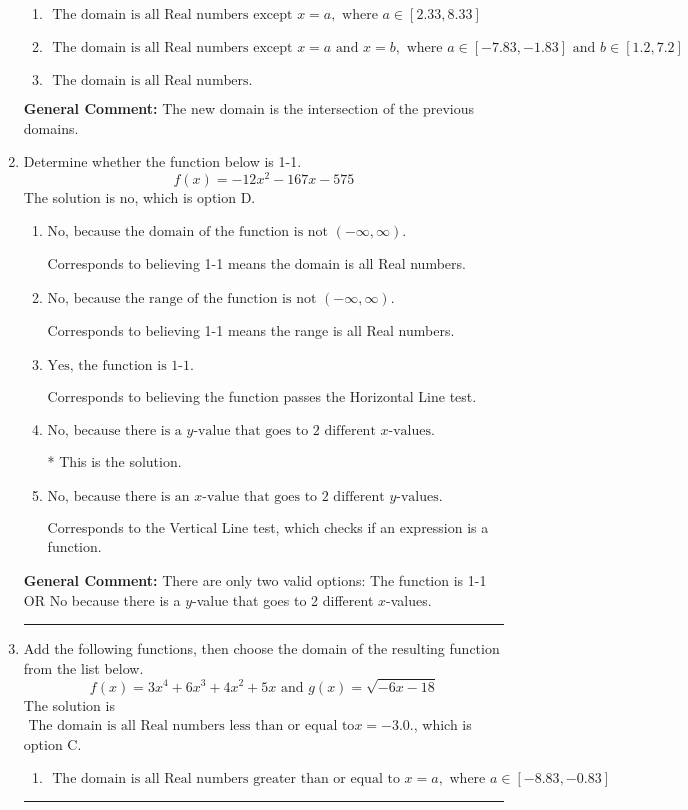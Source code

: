 \documentclass{extbook}[14pt]
\newcommand{\litem}[1]{\item #1

\rule{\textwidth}{0.4pt}}
\begin{document}
\begin{enumerate}
{\begin{enumerate}[label=\Alph*.]
\item \( \text{ The domain is all Real numbers except } x = a, \text{ where } a \in [2.33, 8.33] \)


\item \( \text{ The domain is all Real numbers except } x = a \text{ and } x = b, \text{ where } a \in [-7.83, -1.83] \text{ and } b \in [1.2, 7.2] \)


\item \( \text{ The domain is all Real numbers. } \)


\end{enumerate}

\textbf{General Comment:} The new domain is the intersection of the previous domains.
}
\litem{
Determine whether the function below is 1-1.
\[ f(x) = -12 x^2 - 167 x - 575 \]The solution is \( \text{no} \), which is option D.\begin{enumerate}[label=\Alph*.]
\item \( \text{No, because the domain of the function is not $(-\infty, \infty)$.} \)

Corresponds to believing 1-1 means the domain is all Real numbers.
\item \( \text{No, because the range of the function is not $(-\infty, \infty)$.} \)

Corresponds to believing 1-1 means the range is all Real numbers.
\item \( \text{Yes, the function is 1-1.} \)

Corresponds to believing the function passes the Horizontal Line test.
\item \( \text{No, because there is a $y$-value that goes to 2 different $x$-values.} \)

* This is the solution.
\item \( \text{No, because there is an $x$-value that goes to 2 different $y$-values.} \)

Corresponds to the Vertical Line test, which checks if an expression is a function.
\end{enumerate}

\textbf{General Comment:} There are only two valid options: The function is 1-1 OR No because there is a $y$-value that goes to 2 different $x$-values.
}
\litem{
Add the following functions, then choose the domain of the resulting function from the list below.
\[ f(x) = 3x^{4} +6 x^{3} +4 x^{2} +5 x \text{ and } g(x) = \sqrt{-6x-18}  \]The solution is \( \text{ The domain is all Real numbers less than or equal to} x = -3.0. \), which is option C.\begin{enumerate}[label=\Alph*.]
\item \( \text{ The domain is all Real numbers greater than or equal to } x = a, \text{ where } a \in [-8.83, -0.83] \)



\end{enumerate}}
\end{enumerate}
\end{document}
